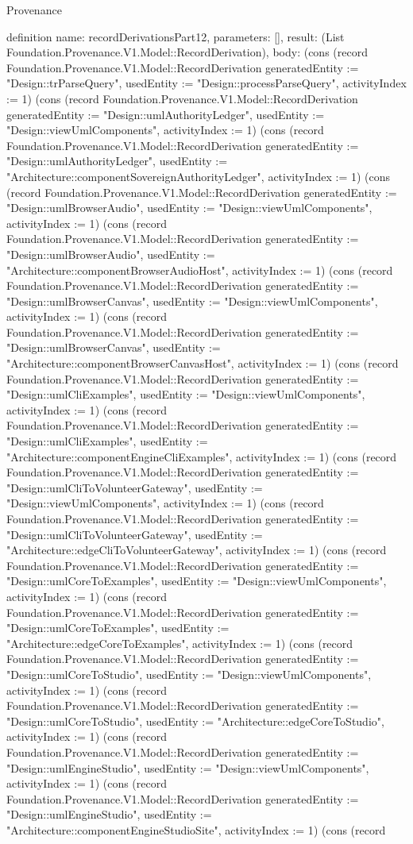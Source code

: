 \begin{lexlean}{Provenance}
\begin{semanticmodule}
definition{
  name: recordDerivationsPart12,
  parameters: [],
  result: (List Foundation.Provenance.V1.Model::RecordDerivation),
  body: (cons (record Foundation.Provenance.V1.Model::RecordDerivation {generatedEntity := "Design::trParseQuery", usedEntity := "Design::processParseQuery", activityIndex := 1}) (cons (record Foundation.Provenance.V1.Model::RecordDerivation {generatedEntity := "Design::umlAuthorityLedger", usedEntity := "Design::viewUmlComponents", activityIndex := 1}) (cons (record Foundation.Provenance.V1.Model::RecordDerivation {generatedEntity := "Design::umlAuthorityLedger", usedEntity := "Architecture::componentSovereignAuthorityLedger", activityIndex := 1}) (cons (record Foundation.Provenance.V1.Model::RecordDerivation {generatedEntity := "Design::umlBrowserAudio", usedEntity := "Design::viewUmlComponents", activityIndex := 1}) (cons (record Foundation.Provenance.V1.Model::RecordDerivation {generatedEntity := "Design::umlBrowserAudio", usedEntity := "Architecture::componentBrowserAudioHost", activityIndex := 1}) (cons (record Foundation.Provenance.V1.Model::RecordDerivation {generatedEntity := "Design::umlBrowserCanvas", usedEntity := "Design::viewUmlComponents", activityIndex := 1}) (cons (record Foundation.Provenance.V1.Model::RecordDerivation {generatedEntity := "Design::umlBrowserCanvas", usedEntity := "Architecture::componentBrowserCanvasHost", activityIndex := 1}) (cons (record Foundation.Provenance.V1.Model::RecordDerivation {generatedEntity := "Design::umlCliExamples", usedEntity := "Design::viewUmlComponents", activityIndex := 1}) (cons (record Foundation.Provenance.V1.Model::RecordDerivation {generatedEntity := "Design::umlCliExamples", usedEntity := "Architecture::componentEngineCliExamples", activityIndex := 1}) (cons (record Foundation.Provenance.V1.Model::RecordDerivation {generatedEntity := "Design::umlCliToVolunteerGateway", usedEntity := "Design::viewUmlComponents", activityIndex := 1}) (cons (record Foundation.Provenance.V1.Model::RecordDerivation {generatedEntity := "Design::umlCliToVolunteerGateway", usedEntity := "Architecture::edgeCliToVolunteerGateway", activityIndex := 1}) (cons (record Foundation.Provenance.V1.Model::RecordDerivation {generatedEntity := "Design::umlCoreToExamples", usedEntity := "Design::viewUmlComponents", activityIndex := 1}) (cons (record Foundation.Provenance.V1.Model::RecordDerivation {generatedEntity := "Design::umlCoreToExamples", usedEntity := "Architecture::edgeCoreToExamples", activityIndex := 1}) (cons (record Foundation.Provenance.V1.Model::RecordDerivation {generatedEntity := "Design::umlCoreToStudio", usedEntity := "Design::viewUmlComponents", activityIndex := 1}) (cons (record Foundation.Provenance.V1.Model::RecordDerivation {generatedEntity := "Design::umlCoreToStudio", usedEntity := "Architecture::edgeCoreToStudio", activityIndex := 1}) (cons (record Foundation.Provenance.V1.Model::RecordDerivation {generatedEntity := "Design::umlEngineStudio", usedEntity := "Design::viewUmlComponents", activityIndex := 1}) (cons (record Foundation.Provenance.V1.Model::RecordDerivation {generatedEntity := "Design::umlEngineStudio", usedEntity := "Architecture::componentEngineStudioSite", activityIndex := 1}) (cons (record }
\end{semanticmodule}
\end{lexlean}

